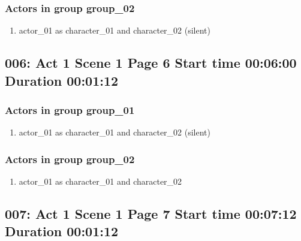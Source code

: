 \subsubsection{Actors in group group\_02}
\begin{enumerate}
\item actor\_01 as character\_01 and character\_02 (silent)
\end{enumerate}


\subsection{006: Act 1 Scene 1 Page 6 Start time 00:06:00 Duration 00:01:12}

\subsubsection{Actors in group group\_01}
\begin{enumerate}
\item actor\_01 as character\_01 and character\_02 (silent)
\end{enumerate}
\subsubsection{Actors in group group\_02}
\begin{enumerate}
\item actor\_01 as character\_01 and character\_02
\end{enumerate}


\subsection{007: Act 1 Scene 1 Page 7 Start time 00:07:12 Duration 00:01:12}


